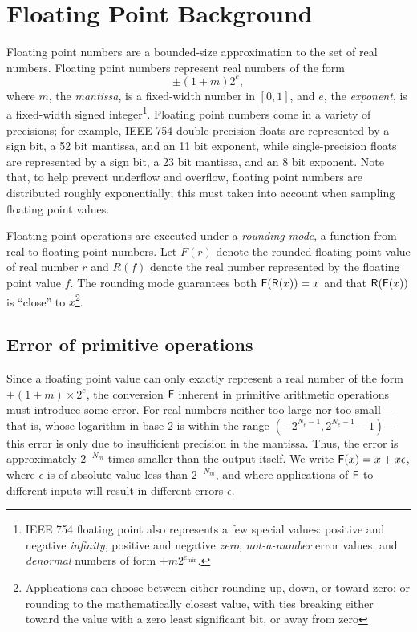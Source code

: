 \documentclass[paper.tex]{subfiles}
\begin{document}

\section{Floating Point Background}
\label{sec:background}

Floating point numbers are a bounded-size approximation
  to the set of real numbers.
Floating point numbers represent real numbers of the form
\[ \pm (1 + m) 2^e, \]%
where $m$, the \emph{mantissa}, is a fixed-width number in $[0, 1]$,
and $e$, the \emph{exponent}, is a fixed-width signed
integer\footnote{IEEE 754 floating point also represents a few special
  values: positive and negative \emph{infinity}, positive and negative
  \emph{zero}, \emph{not-a-number} error values, and \emph{denormal}
  numbers of form $\pm m 2^{e_{\text{min}}}$.}.
Floating point numbers come in a variety of precisions;
  for example, IEEE 754 double-precision floats are represented by a sign bit,
  a 52 bit mantissa, and an 11 bit exponent,
  while single-precision floats are represented by a sign bit,
  a 23 bit mantissa, and an 8 bit exponent.
Note that, to help prevent underflow and overflow,
  floating point numbers are distributed roughly exponentially;
  this must taken into account when sampling floating point values.

Floating point operations are executed under a \textit{rounding mode},
  a function from real to floating-point numbers.
Let $F(r)$ denote the rounded floating point value of real number $r$
and $R(f)$ denote the real number represented by
  the floating point value $f$.
The rounding mode guarantees both $\mathsf{F}(\mathsf{R}(x)) = x$ and that
  $\mathsf{R}(\mathsf{F}(x))$ is ``close'' to $x$\footnote{Applications can choose
  between either rounding up, down, or toward zero; or rounding to the
  mathematically closest value, with ties breaking either toward the
  value with a zero least significant bit, or away from zero}.

\subsection{Error of primitive operations}

Since a floating point value can only exactly represent
  a real number of the form $\pm(1 + m) \times 2^e$,
  the conversion $\mathsf{F}$ inherent in primitive arithmetic operations must introduce some error.
For real numbers neither too large nor too small---%
  that is, whose logarithm in base 2 is within the range
  $(-2^{N_e-1}, 2^{N_e-1} - 1)$---%
  this error is only due to insufficient precision in the mantissa.
Thus, the error is approximately $2^{-N_m}$ times smaller
  than the output itself.
We write $\mathsf{F}(x) = x + x\epsilon$, where $\epsilon$
  is of absolute value less than $2^{-N_m}$, and where applications of
  $\mathsf{F}$ to different inputs will result in different errors $\epsilon$.
\end{document}
